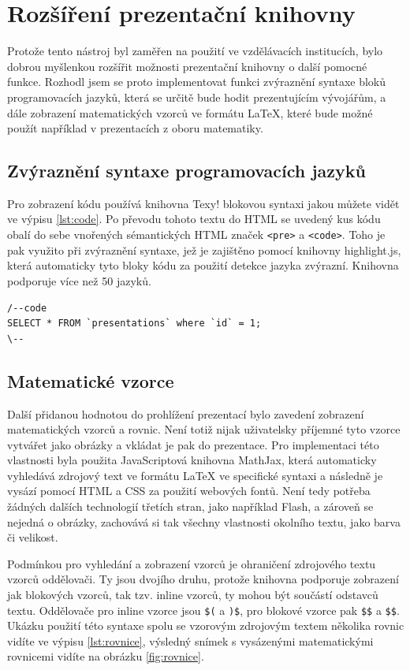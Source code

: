\documentclass[11pt,twoside,a4paper]{book}
\begin{document}
\section{Rozšíření prezentační knihovny}
Protože tento nástroj byl zaměřen na použití ve vzdělávacích institucích, bylo dobrou myšlenkou rozšířit možnosti prezentační knihovny o další pomocné funkce. Rozhodl jsem se proto implementovat funkci zvýraznění syntaxe bloků programovacích jazyků, která se určitě bude hodit prezentujícím vývojářům, a dále zobrazení matematických vzorců ve formátu \LaTeX, které bude možné použít například v prezentacích z oboru matematiky.

\subsection{Zvýraznění syntaxe programovacích jazyků}
Pro zobrazení kódu používá knihovna Texy! blokovou syntaxi jakou můžete vidět ve výpisu \ref{lst:code}. Po převodu tohoto textu do HTML se uvedený kus kódu obalí do sebe vnořených sémantických HTML značek \verb|<pre>| a \verb|<code>|. Toho je pak využito při zvýraznění syntaxe, jež je zajištěno pomocí knihovny highlight.js\cite{highlight}, která automaticky tyto bloky kódu za použití detekce jazyka zvýrazní. Knihovna podporuje více než 50 jazyků.

\begin{lstlisting}[caption={Ukázka blokové syntaxe pro výpis kódu},label={lst:code}]
/--code
SELECT * FROM `presentations` where `id` = 1;
\--
\end{lstlisting}


\subsection{Matematické vzorce}
Další přidanou hodnotou do prohlížení prezentací bylo zavedení zobrazení matematických vzorců a rovnic. Není totiž nijak uživatelsky příjemné tyto vzorce vytvářet jako obrázky a vkládat je pak do prezentace. Pro implementaci této vlastnosti byla použita JavaScriptová knihovna MathJax\citep{mathjax}, která automaticky vyhledává zdrojový text ve formátu \LaTeX\cite{latex} ve specifické syntaxi a následně je vysází pomocí HTML a CSS za použití webových fontů. Není tedy potřeba žádných dalších technologií třetích stran, jako například Flash, a zároveň se nejedná o obrázky, zachovává si tak všechny vlastnosti okolního textu, jako barva či velikost.

Podmínkou pro vyhledání a zobrazení vzorců je ohraničení zdrojového textu vzorců oddělovači. Ty jsou dvojího druhu, protože knihovna podporuje zobrazení jak blokových vzorců, tak tzv. inline vzorců, ty mohou být součástí odstavců textu. Oddělovače pro inline vzorce jsou \verb|$(| a \verb|)$|, pro blokové vzorce pak \verb|$$| a \verb|$$|. Ukázku použití této syntaxe spolu se vzorovým zdrojovým textem několika rovnic vidíte ve výpisu \ref{lst:rovnice}, výsledný snímek s vysázenými matematickými rovnicemi vidíte na obrázku \ref{fig:rovnice}.
\end{document}
